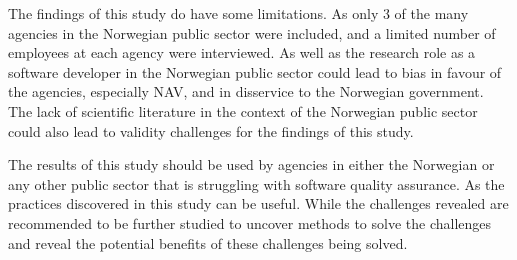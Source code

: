 The findings of this study do have some limitations. As only 3 of the many agencies in the Norwegian public sector were included, and a limited number of employees at each agency were interviewed. As well as the research role as a software developer in the Norwegian public sector could lead to bias in favour of the agencies, especially NAV, and in disservice to the Norwegian government. The lack of scientific literature in the context of the Norwegian public sector could also lead to validity challenges for the findings of this study.

The results of this study should be used by agencies in either the Norwegian or any other public sector that is struggling with software quality assurance. As the practices discovered in this study can be useful. While the challenges revealed are recommended to be further studied to uncover methods to solve the challenges and reveal the potential benefits of these challenges being solved.